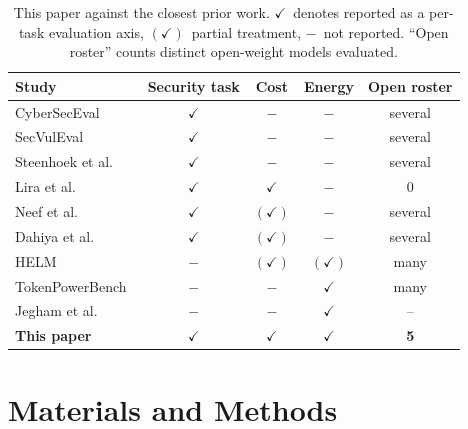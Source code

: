 \documentclass[computers,article,submit,moreauthors]{Definitions/mdpi}
\newcommand{\cmark}{\ensuremath{\checkmark}}
\newcommand{\pmark}{\ensuremath{(\checkmark)}}
\newcommand{\xmark}{\ensuremath{-}}
\begin{document}
\begin{table}[H]
\caption{This paper against the closest prior work. \cmark\ denotes reported as a per-task evaluation axis, \pmark\ partial treatment, \xmark\ not reported. ``Open roster'' counts distinct open-weight models evaluated.\label{tab:gap}}
\begin{tabularx}{\textwidth}{XcccC}
\toprule
\textbf{Study} & \textbf{Security task} & \textbf{Cost} & \textbf{Energy} & \textbf{Open roster}\\
\midrule
CyberSecEval~\citep{cyberseceval} & \cmark & \xmark & \xmark & several\\
SecVulEval~\citep{secvuleval} & \cmark & \xmark & \xmark & several\\
Steenhoek et al.~\citep{steenhoek} & \cmark & \xmark & \xmark & several\\
Lira et al.~\citep{lira} & \cmark & \cmark & \xmark & 0\\
Neef et al.~\citep{neef} & \cmark & \pmark & \xmark & several\\
Dahiya et al.~\citep{dahiya} & \cmark & \pmark & \xmark & several\\
\midrule
HELM~\citep{helm} & \xmark & \pmark & \pmark & many\\
TokenPowerBench~\citep{tokenpowerbench} & \xmark & \xmark & \cmark & many\\
Jegham et al.~\citep{jegham} & \xmark & \xmark & \cmark & --\\
\midrule
\textbf{This paper} & \cmark & \cmark & \cmark & \textbf{5}\\
\bottomrule
\end{tabularx}
\end{table}

\section{Materials and Methods}\label{sec:methods}
\end{document}

